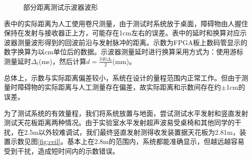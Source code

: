 \documentclass[a4paper, twocolumn]{ctexart}
\begin{document}
\begin{figure}[ht]
    \centering
    \caption{部分距离测试示波器波形}
    \label{fig:dis_result_osc}
\end{figure}

表中的实际距离为人工使用卷尺测量，由于测试时系统放于桌面，障碍物由人握住保持在发射与接收器正上方，可能存在1cm左右的误差。表中的延时和换算对应示波器测量波形得到的回波前沿与发射脉冲的距离。示数为FPGA板上数码管显示的数字换算为以cm单位后的数据。示波器测量延时进行换算采用方式为：使用游标测量延时$\Delta_t$(ms)，然后计算$d = \frac{340 \Delta_t}{2}$(mm)。

总体上，示数与实际距离偏差较小，系统在设计的量程范围内正常工作。但由于测量时障碍物的实际距离与人工测量存在偏差，故实际距离和示数间存在约$\pm$1cm的误差。

为了测试系统的有效量程，我们将系统放置与地面，尝试测试水平发射和竖直发射测试天花板距离两种情况。由于实验室水平发射超声波易受桌椅和其他同学的干扰，在2.5m以外较难调试，我们最终竖直发射测得收发装置据天花板为2.81m，装置示数见图\ref{fig:ceil}。基本上在2.8m的范围内，系统都能准确显示，但越远越容易受到干扰，造成短时间内的示数错误。
\end{document}
